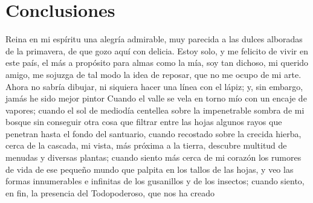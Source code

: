 \chapter{Conclusiones}

Reina en mi espíritu una alegría admirable, muy parecida a las dulces alboradas de la primavera, de que gozo aquí con delicia. Estoy solo, y me felicito de vivir en este país, el más a propósito para almas como la mía, soy tan dichoso, mi querido amigo, me sojuzga de tal modo la idea de reposar, que no me ocupo de mi arte. Ahora no sabría dibujar, ni siquiera hacer una línea con el lápiz; y, sin embargo, jamás he sido mejor pintor Cuando el valle se vela en torno mío con un encaje de vapores; cuando el sol de mediodía centellea sobre la impenetrable sombra de mi bosque sin conseguir otra cosa que filtrar entre las hojas algunos rayos que penetran hasta el fondo del santuario, cuando recostado sobre la crecida hierba, cerca de la cascada, mi vista, más próxima a la tierra, descubre multitud de menudas y diversas plantas; cuando siento más cerca de mi corazón los rumores de vida de ese pequeño mundo que palpita en los tallos de las hojas, y veo las formas innumerables e infinitas de los gusanillos y de los insectos; cuando siento, en fin, la presencia del Todopoderoso, que nos ha creado